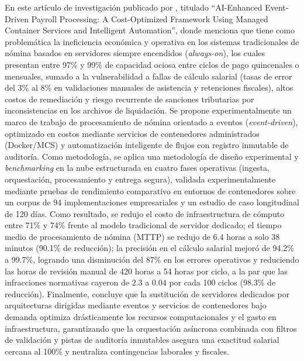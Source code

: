 En este artículo de investigación publicado por \textcite{chattopadhyay2026ai}, titulado ``AI-Enhanced Event-Driven Payroll Processing: 
A Cost-Optimized Framework Using Managed Container Services and Intelligent Automation'', 
donde menciona que tiene como problemática la ineficiencia económica y operativa en los sistemas tradicionales de nómina basados en servidores siempre encendidos 
(\textit{always-on}), los cuales presentan entre 97\% y 99\% de capacidad ociosa entre ciclos de pago quincenales o mensuales, 
sumado a la vulnerabilidad a fallas de cálculo salarial (tasas de error del 3\% al 8\% en validaciones manuales de asistencia y retenciones fiscales), 
altos costos de remediación y riesgo recurrente de sanciones tributarias por inconsistencias en los archivos de liquidación. 
Se propone experimentalmente un marco de trabajo de procesamiento de nómina orientado a eventos (\textit{event-driven}), 
optimizado en costos mediante servicios de contenedores administrados (Docker/MCS) y automatización inteligente de flujos con registro inmutable de auditoría. 
Como metodología, se aplica una metodología de diseño experimental y \textit{benchmarking} en la nube estructurada en cuatro fases operativas (ingesta, orquestación, procesamiento y entrega segura), 
validada experimentalmente mediante pruebas de rendimiento comparativo en entornos de contenedores sobre un corpus de 94 implementaciones empresariales y un estudio de caso longitudinal de 120 días. 
Como resultado, se redujo el costo de infraestructura de cómputo entre 71\% y 74\% frente al modelo tradicional de servidor dedicado; el tiempo medio de procesamiento de nómina (MTTP) 
se redujo de 6.4 horas a solo 38 minutos (90.1\% de reducción); la precisión en el cálculo salarial mejoró de 94.2\% a 99.7\%, logrando una disminución del 87\% en los errores operativos 
y reduciendo las horas de revisión manual de 420 horas a 54 horas por ciclo, a la par que las infracciones normativas cayeron de 2.3 a 0.04 por cada 100 ciclos (98.3\% de reducción).
Finalmente, concluye que la sustitución de servidores dedicados por arquitecturas dirigidas mediante eventos y servicios de contenedores 
bajo demanda optimiza drásticamente los recursos computacionales y el gasto en infraestructura, garantizando que la orquestación asíncrona combinada 
con filtros de validación y pistas de auditoría inmutables asegura una exactitud salarial cercana al 100\% y neutraliza contingencias laborales y fiscales.